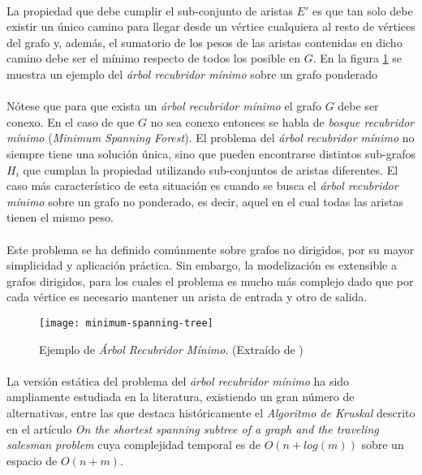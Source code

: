 \documentclass{subfiles}
\begin{document}
        \paragraph{}
        La propiedad que debe cumplir el sub-conjunto de aristas $E'$ es que tan solo debe existir un único camino para llegar desde un vértice cualquiera al resto de vértices del grafo y, además, el sumatorio de los pesos de las aristas contenidas en dicho camino debe ser el mínimo respecto de todos los posible en $G$. En la figura \ref{img:minimum_spanning_tree} se muestra un ejemplo del  \emph{árbol recubridor mínimo} sobre un grafo ponderado

        \paragraph{}
        Nótese que para que exista un \emph{árbol recubridor mínimo} el grafo $G$ debe ser conexo. En el caso de que $G$ no sea conexo entonces se habla de \emph{bosque recubridor mínimo} (\emph{Minimum Spanning Forest}). El problema del \emph{árbol recubridor mínimo} no siempre tiene una solución única, sino que pueden encontrarse distintos sub-grafos $H_i$ que cumplan la propiedad utilizando sub-conjuntos de aristas diferentes. El caso más característico de esta situación es cuando se busca el \emph{árbol recubridor mínimo} sobre un grafo no ponderado, es decir, aquel en el cual todas las aristas tienen el mismo peso.

        \paragraph{}
        Este problema se ha definido comúnmente sobre grafos no dirigidos, por su mayor simplicidad y aplicación práctica. Sin embargo, la modelización es extensible a grafos dirigidos, para los cuales el problema es mucho más complejo dado que por cada vértice es necesario mantener un arista de entrada y otro de salida.

        \begin{figure}
          \centering
          \texttt{[image: minimum-spanning-tree]}
          \caption{Ejemplo de \emph{Árbol Recubridor Mínimo}. (Extraído de \cite{wiki:Minimum_spanning_tree})}
          \label{img:minimum_spanning_tree}
        \end{figure}

        \paragraph{}
        La versión estática del problema del \emph{árbol recubridor mínimo} ha sido ampliamente estudiada en la literatura, existiendo un gran número de alternativas, entre las que destaca históricamente el \emph{Algoritmo de Kruskal} descrito en el artículo \emph{On the shortest spanning subtree of a graph and the traveling salesman problem} \cite{kruskal1956shortest} cuya complejidad temporal es de $O(n + log(m))$ sobre un espacio de $O(n+m)$.
\end{document}
